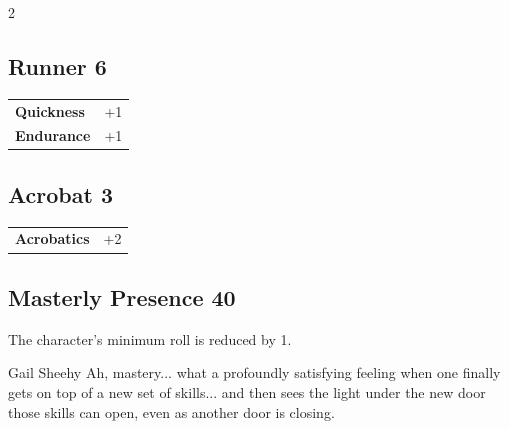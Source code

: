 \begin{multicols}{2}
\begin{tcolorbox}
\end{tcolorbox}

\begin{tcolorbox}
    \subsection*{Runner \hfill \small{6 }}
    \tcblower




\begin{tabular}{@{}ll@{}}
    \textbf{Quickness} & +1\\
    \textbf{Endurance} & +1\\
\end{tabular}


\end{tcolorbox}

\begin{tcolorbox}
    \subsection*{Acrobat \hfill \small{3 }}
    \tcblower




\begin{tabular}{@{}ll@{}}
    \textbf{Acrobatics} & +2\\
\end{tabular}


\end{tcolorbox}

\begin{tcolorbox}
    \subsection*{Masterly Presence \hfill \small{40 }}
    \tcblower
The character's minimum roll is reduced by 1.

\begin{pquote}{Gail Sheehy}
Ah, mastery... what a profoundly satisfying feeling when one finally gets on top of a new set of skills... and then sees the light under the new door those skills can open, even as another door is closing.
\end{pquote}


\end{tcolorbox}
\end{multicols}
